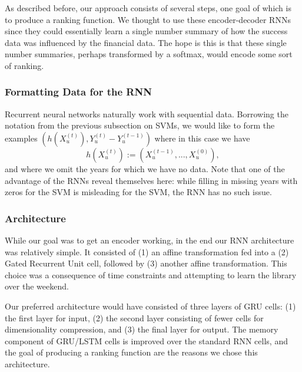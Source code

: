 \documentclass[paper.tex]{subfiles}
\begin{document}
As described before, our approach consists of several steps, one goal of which is to produce a ranking function. We thought to use these encoder-decoder RNNs since they could essentially learn a single number summary of how the success data was influenced by the financial data. The hope is this is that these single number summaries, perhaps transformed by a softmax, would encode some sort of ranking.  

\subsubsection{Formatting Data for the RNN} Recurrent neural networks naturally work with sequential data. Borrowing the notation from the previous subsection on SVMs, we would like to form the examples $(h(X_u^{(t)}), Y_u^{(t)} - Y_u^{(t - 1)})$ where in this case we have \[ h(X_u^{(t)}) := (X_u^{(t - 1)}, ..., X_u^{(0)}),\] and where we omit the years for which we have no data. Note that one of the advantage of the RNNs reveal themselves here: while filling in missing years with zeros for the SVM is misleading for the SVM, the RNN has no such issue. 


\subsubsection{Architecture}
While our goal was to get an encoder working, in the end our RNN architecture was relatively simple. It consisted of (1) an affine transformation fed into a (2) Gated Recurrent Unit cell, followed by (3) another affine transformation. This choice was a consequence of time constraints and attempting to learn the library over the weekend.

Our preferred architecture would have consisted of three layers of GRU cells: (1) the first layer for input, (2) the second layer consisting of fewer cells for dimensionality compression, and (3) the final layer for output. The memory component of GRU/LSTM cells is improved over the standard RNN cells, and the goal of producing a ranking function are the reasons we chose this architecture.
\end{document}
